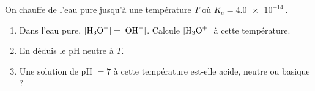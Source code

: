 \documentclass[11pt,a4paper]{article}
\begin{document}
\begin{exo}
On chauffe de l'eau pure jusqu'à une température $T$ où $K_e = \qty{4,0e-14}{}$.
\begin{enumerate}[label=\alph*)]
  \item Dans l'eau pure, $[\ce{H3O+}] = [\ce{OH-}]$. Calcule $[\ce{H3O+}]$ à cette température.
  \item En déduis le pH neutre à $T$.
  \item Une solution de pH $= 7$ à cette température est-elle acide, neutre ou basique ?
\end{enumerate}
\end{exo}
\end{document}

